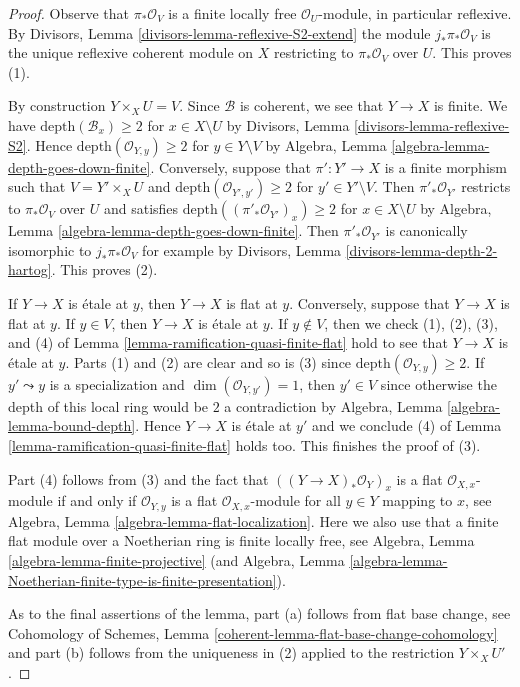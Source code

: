 \documentclass{stacks-project}
\theoremstyle{plain}
\theoremstyle{definition}
\theoremstyle{remark}
\numberwithin{equation}{subsection}
\begin{document}
\begin{proof}
Observe that $\pi_*\mathcal{O}_V$ is a finite locally free
$\mathcal{O}_U$-module, in particular reflexive.
By Divisors, Lemma \ref{divisors-lemma-reflexive-S2-extend}
the module $j_*\pi_*\mathcal{O}_V$ is the unique
reflexive coherent module on $X$ restricting to
$\pi_*\mathcal{O}_V$ over $U$. This proves (1).

\medskip\noindent
By construction $Y \times_X U = V$.
Since $\mathcal{B}$ is coherent, we see that $Y \to X$ is finite.
We have $\text{depth}(\mathcal{B}_x) \geq 2$ for $x \in X \setminus U$
by Divisors, Lemma \ref{divisors-lemma-reflexive-S2}.
Hence $\text{depth}(\mathcal{O}_{Y, y}) \geq 2$ for $y \in Y \setminus V$
by Algebra, Lemma \ref{algebra-lemma-depth-goes-down-finite}.
Conversely, suppose that $\pi' : Y' \to X$ is a finite morphism such that
$V = Y' \times_X U$ and $\text{depth}(\mathcal{O}_{Y', y'}) \geq 2$
for $y' \in Y' \setminus V$. Then $\pi'_*\mathcal{O}_{Y'}$
restricts to $\pi_*\mathcal{O}_V$ over $U$ and satisfies
$\text{depth}((\pi'_*\mathcal{O}_{Y'})_x) \geq 2$ for
$x \in X \setminus U$ by
Algebra, Lemma \ref{algebra-lemma-depth-goes-down-finite}.
Then $\pi'_*\mathcal{O}_{Y'}$ is canonically isomorphic
to $j_*\pi_*\mathcal{O}_V$ for example by
Divisors, Lemma \ref{divisors-lemma-depth-2-hartog}.
This proves (2).

\medskip\noindent
If $Y \to X$ is \'etale at $y$, then $Y \to X$ is flat at $y$.
Conversely, suppose that $Y \to X$ is flat at $y$.
If $y \in V$, then $Y \to X$ is \'etale at $y$.
If $y \not \in V$, then we check (1), (2), (3), and (4) of
Lemma \ref{lemma-ramification-quasi-finite-flat} hold
to see that $Y \to X$ is \'etale at $y$. Parts (1) and (2)
are clear and so is (3) since $\text{depth}(\mathcal{O}_{Y, y}) \geq 2$.
If $y' \leadsto y$ is a specialization and $\dim(\mathcal{O}_{Y, y'}) = 1$,
then $y' \in V$ since otherwise the depth of this local ring
would be $2$ a contradiction by
Algebra, Lemma \ref{algebra-lemma-bound-depth}.
Hence $Y \to X$ is \'etale at $y'$ and we conclude (4) of
Lemma \ref{lemma-ramification-quasi-finite-flat} holds too.
This finishes the proof of (3).

\medskip\noindent
Part (4) follows from (3) and the fact that $((Y \to X)_*\mathcal{O}_Y)_x$
is a flat $\mathcal{O}_{X, x}$-module if and only if $\mathcal{O}_{Y, y}$
is a flat $\mathcal{O}_{X, x}$-module for all $y \in Y$ mapping to $x$, see
Algebra, Lemma \ref{algebra-lemma-flat-localization}. Here we also
use that a finite flat module over a Noetherian ring is finite locally
free, see Algebra, Lemma \ref{algebra-lemma-finite-projective}
(and
Algebra, Lemma
\ref{algebra-lemma-Noetherian-finite-type-is-finite-presentation}).

\medskip\noindent
As to the final assertions of the lemma, part (a) follows from
flat base change, see
Cohomology of Schemes, Lemma \ref{coherent-lemma-flat-base-change-cohomology}
and part (b) follows from the uniqueness in (2) applied to the restriction
$Y \times_X U'$.
\end{proof}
\end{document}
